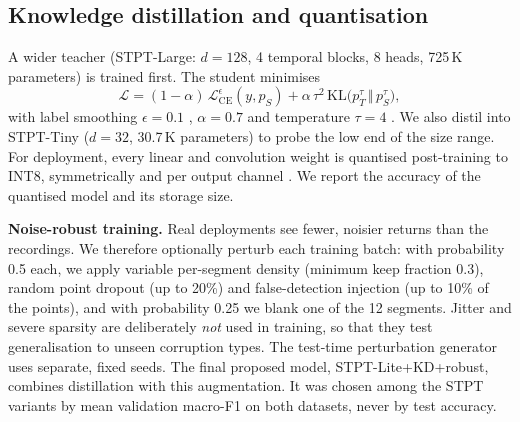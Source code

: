 \subsection{Knowledge distillation and quantisation}
A wider teacher (STPT-Large: $d=128$, 4 temporal blocks, 8 heads, 725\,K
parameters) is trained first. The student minimises
\begin{equation}
\mathcal{L}=(1-\alpha)\,\mathcal{L}_{\mathrm{CE}}^{\epsilon}(y,p_S)+\alpha\,\tau^2\,\mathrm{KL}\big(p_T^{\tau}\,\Vert\,p_S^{\tau}\big),
\end{equation}
with label smoothing $\epsilon=0.1$ \cite{szegedy2016inception}, $\alpha=0.7$
and temperature $\tau=4$ \cite{hinton2015kd}. We also distil into STPT-Tiny
($d=32$, 30.7\,K parameters) to probe the low end of the size range. For
deployment, every linear and convolution weight is quantised post-training to
INT8, symmetrically and per output channel \cite{jacob2018quant}. We report the
accuracy of the quantised model and its storage size.

\textbf{Noise-robust training.} Real deployments see fewer, noisier returns than
the recordings. We therefore optionally perturb each training batch: with
probability 0.5 each, we apply variable per-segment density (minimum keep
fraction 0.3), random point dropout (up to 20\%) and false-detection injection
(up to 10\% of the points), and with probability 0.25 we blank one of the 12
segments. Jitter and severe sparsity are deliberately \emph{not} used in
training, so that they test generalisation to unseen corruption types. The
test-time perturbation generator uses separate, fixed seeds. The final proposed
model, STPT-Lite+KD+robust, combines distillation with this augmentation. It
was chosen among the STPT variants by mean validation macro-F1 on both datasets,
never by test accuracy.
